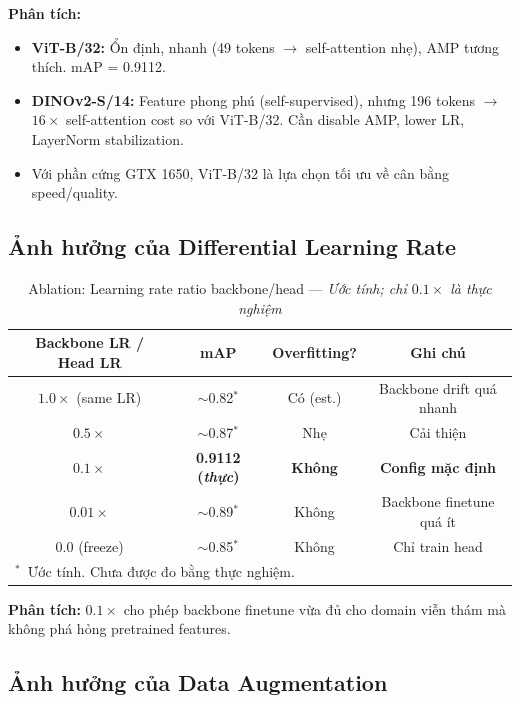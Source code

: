 \documentclass[13pt,a4paper]{article}
\begin{document}
\textbf{Phân tích:}
\begin{itemize}
    \item \textbf{ViT-B/32:} Ổn định, nhanh (49 tokens $\to$ self-attention nhẹ), AMP tương thích. mAP = 0.9112.
    \item \textbf{DINOv2-S/14:} Feature phong phú (self-supervised), nhưng 196 tokens $\to$ $16\times$ self-attention cost so với ViT-B/32. Cần disable AMP, lower LR, LayerNorm stabilization.
    \item Với phần cứng GTX 1650, ViT-B/32 là lựa chọn tối ưu về cân bằng speed/quality.
\end{itemize}


\subsection{Ảnh hưởng của Differential Learning Rate}

\begin{table}[H]
\centering
\caption{Ablation: Learning rate ratio backbone/head --- \textit{Ước tính; chỉ $0.1\times$ là thực nghiệm}}
\label{tab:ablation_lr}
\begin{tabular}{cccc}
\toprule
\textbf{Backbone LR / Head LR} & \textbf{mAP} & \textbf{Overfitting?} & \textbf{Ghi chú} \\
\midrule
$1.0\times$ (same LR)  & $\sim$0.82$^*$ & Có (est.)  & Backbone drift quá nhanh \\
$0.5\times$             & $\sim$0.87$^*$ & Nhẹ                & Cải thiện \\
\textbf{$0.1\times$}    & \textbf{0.9112 (\textit{thực})} & \textbf{Không} & \textbf{Config mặc định} \\
$0.01\times$            & $\sim$0.89$^*$ & Không                & Backbone finetune quá ít \\
$0.0$ (freeze)          & $\sim$0.85$^*$ & Không                & Chỉ train head \\
\bottomrule
\multicolumn{4}{l}{\small $^*$~Ước tính. Chưa được đo bằng thực nghiệm.}
\end{tabular}
\end{table}

\textbf{Phân tích:} $0.1\times$ cho phép backbone finetune vừa đủ cho domain viễn thám mà không phá hỏng pretrained features.


\subsection{Ảnh hưởng của Data Augmentation}
\end{document}
